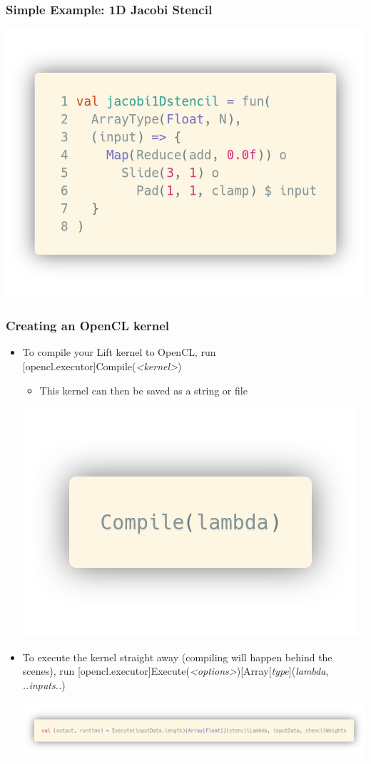 \documentclass[10pt]{beamer}
\begin{document}
\begin{frame}
\frametitle{Simple Example: 1D Jacobi Stencil}
\begin{block}{}
    \begin{center}
    \includegraphics[width=.5\textwidth]{../images/jacobi1Dstencil.png}
    \end{center}
\end{block}
\end{frame}

\begin{frame}
\frametitle{Creating an OpenCL kernel}
\begin{itemize}
    \item To compile your Lift kernel to OpenCL, run [opencl.executor]Compile(\textit{<kernel>}) 
        \begin{itemize}
                \item This kernel can then be saved as a string or file
        \end{itemize}
        \vspace{-.7cm}
        \begin{block}{}
        \begin{center}
            \includegraphics[width=.2\textwidth]{../images/simpleCompile.png}
        \end{center}
        \end{block}
    \item To execute the kernel straight away (compiling will happen behind the scenes), run [opencl.executor]Execute(\textit{<options>})[Array[\textit{type}](\textit{lambda}, \textit{..inputs..}) 
    \begin{block}{}
        \begin{center}
            \includegraphics[width=\textwidth]{../images/execute.png}
        \end{center}
    \end{block}
\end{itemize}
\end{frame}
\end{document}
